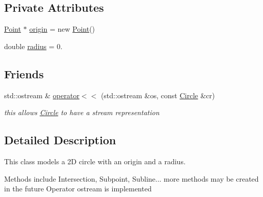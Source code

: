 \subsection*{Private Attributes}
\begin{DoxyCompactItemize}
\item 
\mbox{\hyperlink{class_jinks_draw_1_1_point}{Point}} $\ast$ \mbox{\hyperlink{class_jinks_draw_1_1_circle_a2214560f54448ce8c0bbb41dc956abe4}{origin}} = new \mbox{\hyperlink{class_jinks_draw_1_1_point}{Point}}()
\item 
double \mbox{\hyperlink{class_jinks_draw_1_1_circle_ad38af0c31ab4aa5d90aaf6cf83a60ab2}{radius}} = 0.
\end{DoxyCompactItemize}
\subsection*{Friends}
\begin{DoxyCompactItemize}
\item 
std\+::ostream \& \mbox{\hyperlink{class_jinks_draw_1_1_circle_acde181b779d97f3d80bc38d27e08c403}{operator$<$$<$}} (std\+::ostream \&os, const \mbox{\hyperlink{class_jinks_draw_1_1_circle}{Circle}} \&cr)
\begin{DoxyCompactList}\small\item\em this allows \mbox{\hyperlink{class_jinks_draw_1_1_circle}{Circle}} to have a stream representation \end{DoxyCompactList}\end{DoxyCompactItemize}


\subsection{Detailed Description}
This class models a 2D circle with an origin and a radius. 

Methods include Intersection, Subpoint, Subline... more methods may be created in the future Operator ostream is implemented 
\begin{DoxyCode}{0}
\end{DoxyCode}
 

